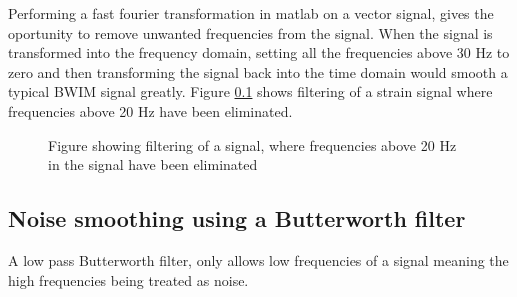 Performing a fast fourier transformation in matlab on a vector signal, gives the oportunity to remove unwanted frequencies from the signal. When the signal is transformed into the frequency domain, setting all the frequencies above 30 Hz to zero and then transforming the signal back into the time domain would smooth a typical BWIM signal greatly.
Figure \ref{} shows filtering of a strain signal where frequencies above 20 Hz have been eliminated.
\begin{figure}[htpb]
	\begin{subfigure}[t]{0.9\textwidth}
		\centering
		
	\end{subfigure}
	\begin{subfigure}[t]{0.9\textwidth}
		\centering
		
	\end{subfigure}
	\caption{Figure showing filtering of a signal, where frequencies above 20 Hz in the signal have been eliminated }
	\label{figure:filteredVSraw}
\end{figure}
\subsection{Noise smoothing using a Butterworth filter}
A low pass Butterworth filter, only allows low frequencies of a signal meaning the high frequencies being treated as noise.
